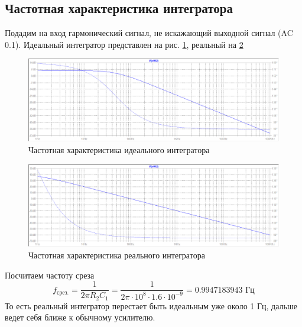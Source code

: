 \documentclass[a4paper, 12pt]{article}
\begin{document}
    \subsection{Частотная характеристика интегратора}
    Подадим на вход гармонический сигнал, не искажающий выходной сигнал (AC 0.1). Идеальный
    интегратор представлен на рис. \ref{fig:3task_ideal_int}, реальный на \ref{fig:3task_real_int}
    \begin{figure}[H]
        \centering
        \includegraphics[scale=0.46]{3task_ideal_int.png}
        \captionsetup{skip=0pt}
        \caption{Частотная характеристика идеального интегратора}
        \label{fig:3task_ideal_int}
    \end{figure}
    \begin{figure}[H]
        \centering
        \includegraphics[scale=0.46]{3task_real_int.png}
        \captionsetup{skip=0pt}
        \caption{Частотная характеристика реального интегратора}
        \label{fig:3task_real_int}
    \end{figure}
    \noindent Посчитаем частоту среза
    $$
    f_{\text{срез.}}=\dfrac{1}{2\pi R_2 C_1}=\dfrac{1}{2\pi\cdot10^8\cdot1.6\cdot10^{-9}}=0.9947183943\text{ Гц}
    $$
    То есть реальный интегратор перестает быть идеальным уже около 1 Гц, дальше ведет себя ближе к обычному усилителю.
\end{document}

